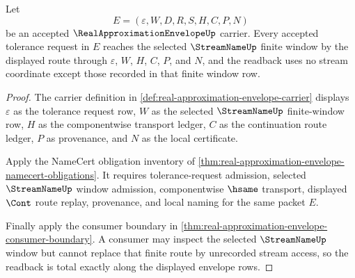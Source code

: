 \begin{theorem}
\label{thm:real-approximation-envelope-window-readback-totality}
Let
$$
E=(\varepsilon,W,D,R,S,H,C,P,N)
$$
be an accepted $\RealApproximationEnvelopeUp$ carrier. Every accepted tolerance request in $E$ reaches the selected $\StreamNameUp$ finite window by the displayed route through $\varepsilon$, $W$, $H$, $C$, $P$, and $N$, and the readback uses no stream coordinate except those recorded in that finite window row.
\end{theorem}
\begin{proof}
The carrier definition in \autoref{def:real-approximation-envelope-carrier} displays $\varepsilon$ as the tolerance request row, $W$ as the selected $\StreamNameUp$ finite-window row, $H$ as the componentwise transport ledger, $C$ as the continuation route ledger, $P$ as provenance, and $N$ as the local certificate.

Apply the NameCert obligation inventory of \autoref{thm:real-approximation-envelope-namecert-obligations}. It requires tolerance-request admission, selected $\StreamNameUp$ window admission, componentwise $\hsame$ transport, displayed $\Cont$ route replay, provenance, and local naming for the same packet $E$.

Finally apply the consumer boundary in \autoref{thm:real-approximation-envelope-consumer-boundary}. A consumer may inspect the selected $\StreamNameUp$ window but cannot replace that finite route by unrecorded stream access, so the readback is total exactly along the displayed envelope rows.
\end{proof}

